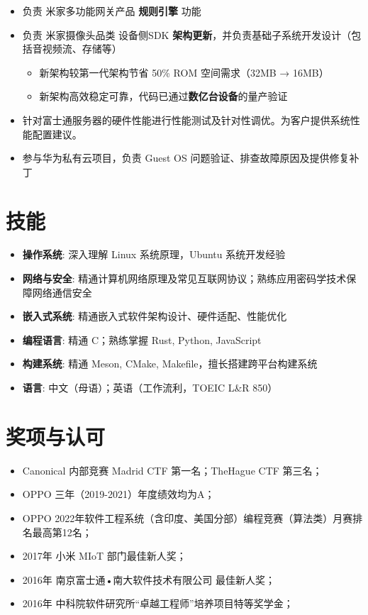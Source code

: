 \documentclass{resume}
\begin{document}
\begin{itemize}
  \item 负责 米家多功能网关产品 \textbf{规则引擎} 功能
  \item 负责 米家摄像头品类 设备侧SDK \textbf{架构更新}，并负责基础子系统开发设计（包括音视频流、存储等）
  \begin{itemize}
    \item 新架构较第一代架构节省 50\% ROM 空间需求（32MB → 16MB）
    \item 新架构高效稳定可靠，代码已通过\textbf{数亿台设备}的量产验证
  \end{itemize}
\end{itemize}

\begin{itemize}
  \item 针对富士通服务器的硬件性能进行性能测试及针对性调优。为客户提供系统性能配置建议。
  \item 参与华为私有云项目，负责 Guest OS 问题验证、排查故障原因及提供修复补丁
\end{itemize}

\section{技能}
\begin{itemize}
  \item \textbf{操作系统}: 深入理解 Linux 系统原理，Ubuntu 系统开发经验
  \item \textbf{网络与安全}: 精通计算机网络原理及常见互联网协议；熟练应用密码学技术保障网络通信安全
  \item \textbf{嵌入式系统}: 精通嵌入式软件架构设计、硬件适配、性能优化
  \item \textbf{编程语言}: 精通 C；熟练掌握 Rust, Python, JavaScript
  \item \textbf{构建系统}: 精通 Meson, CMake, Makefile，擅长搭建跨平台构建系统
  \item \textbf{语言}: 中文（母语）；英语（工作流利，TOEIC L\&R 850）
\end{itemize}


\section{奖项与认可}
\begin{itemize}
  \item Canonical 内部竞赛 Madrid CTF 第一名；TheHague CTF 第三名；
  \item OPPO 三年（2019-2021）年度绩效均为A；
  \item OPPO 2022年软件工程系统（含印度、美国分部）编程竞赛（算法类）月赛排名最高第12名；
  \item 2017年 小米 MIoT 部门最佳新人奖；
  \item 2016年 南京富士通•南大软件技术有限公司 最佳新人奖；
  \item 2016年 中科院软件研究所“卓越工程师”培养项目特等奖学金；
\end{itemize}
\end{document}
